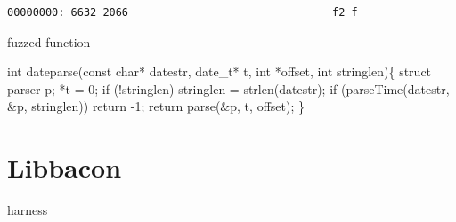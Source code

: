 \documentclass[
  a4paper,
]{scrreprt}
\newenvironment{Shaded}{\begin{snugshade}}{\end{snugshade}}
\newcommand{\ControlFlowTok}[1]{\textcolor[rgb]{0.85,0.12,0.09}{#1}}
\newcommand{\DataTypeTok}[1]{\textcolor[rgb]{0.47,0.16,0.63}{#1}}
\newcommand{\DecValTok}[1]{\textcolor[rgb]{0.47,0.16,0.63}{#1}}
\newcommand{\KeywordTok}[1]{\textcolor[rgb]{0.85,0.12,0.09}{#1}}
\newcommand{\NormalTok}[1]{\textcolor[rgb]{0.33,0.33,0.33}{#1}}
\newcommand{\OperatorTok}[1]{\textcolor[rgb]{0.00,0.46,0.62}{#1}}
\theoremstyle{definition}
\theoremstyle{remark}
\begin{document}
\begin{verbatim}
00000000: 6632 2066                                f2 f
\end{verbatim}

fuzzed function

\begin{Shaded}
\begin{Highlighting}[numbers=left,,]
\DataTypeTok{int}\NormalTok{ dateparse}\OperatorTok{(}\DataTypeTok{const} \DataTypeTok{char}\OperatorTok{*}\NormalTok{ datestr}\OperatorTok{,}\NormalTok{ date\_t}\OperatorTok{*}\NormalTok{ t}\OperatorTok{,} \DataTypeTok{int} \OperatorTok{*}\NormalTok{offset}\OperatorTok{,} \DataTypeTok{int}\NormalTok{ stringlen}\OperatorTok{)\{}
    \KeywordTok{struct}\NormalTok{ parser p}\OperatorTok{;}
    \OperatorTok{*}\NormalTok{t }\OperatorTok{=} \DecValTok{0}\OperatorTok{;}
    \ControlFlowTok{if} \OperatorTok{(!}\NormalTok{stringlen}\OperatorTok{)}
\NormalTok{        stringlen }\OperatorTok{=}\NormalTok{ strlen}\OperatorTok{(}\NormalTok{datestr}\OperatorTok{);}
    \ControlFlowTok{if} \OperatorTok{(}\NormalTok{parseTime}\OperatorTok{(}\NormalTok{datestr}\OperatorTok{,} \OperatorTok{\&}\NormalTok{p}\OperatorTok{,}\NormalTok{ stringlen}\OperatorTok{))}
        \ControlFlowTok{return} \OperatorTok{{-}}\DecValTok{1}\OperatorTok{;}
    \ControlFlowTok{return}\NormalTok{ parse}\OperatorTok{(\&}\NormalTok{p}\OperatorTok{,}\NormalTok{ t}\OperatorTok{,}\NormalTok{ offset}\OperatorTok{);}
\OperatorTok{\}}
\end{Highlighting}
\end{Shaded}

\section{Libbacon}\label{libbacon}

harness
\end{document}
